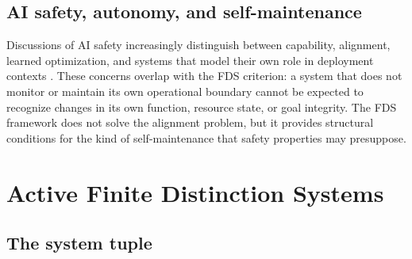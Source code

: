 \documentclass[10pt,a4paper,twocolumn,aps,prl]{revtex4-2}
\begin{document}
\subsection{AI safety, autonomy, and self-maintenance}

Discussions of AI safety increasingly distinguish between capability, alignment, learned optimization, and systems that model their own role in deployment contexts \cite{amodei2016concrete,hubinger2019risks,ngo2023alignment}. These concerns overlap with the FDS criterion: a system that does not monitor or maintain its own operational boundary cannot be expected to recognize changes in its own function, resource state, or goal integrity. The FDS framework does not solve the alignment problem, but it provides structural conditions for the kind of self-maintenance that safety properties may presuppose.

\section{Active Finite Distinction Systems}

\subsection{The system tuple}
\end{document}
